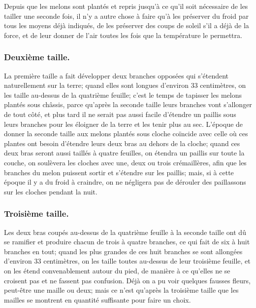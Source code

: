 \documentclass[10pt,a4paper]{book}
\begin{document}
Depuis que les melons sont plantés et repris jusqu'à ce qu'il soit nécessaire de les tailler une seconde fois, il n'y a autre chose à faire qu'à les préserver du froid par tous les moyens déjà indiqués, de les préserver des coups de soleil s'il a déjà de la force, et de leur donner de l'air toutes les fois que la température le permettra.

\subsubsection{Deuxième taille.}

La première taille a fait développer deux branches opposées qui s'étendent naturellement sur la terre; quand elles sont longues d'environ 33 centimètres, on les taille au-dessus de la quatrième feuille; c'est le temps de tapisser les melons plantés sous châssis, parce qu'après la seconde taille leurs branches vont s'allonger de tout côté, et plus tard il ne serait pas aussi facile d'étendre un paillis sous leurs branches pour les éloigner de la terre et les tenir plus au sec. L'époque de donner la seconde taille aux melons plantés sous cloche coïncide avec celle où ces plantes ont besoin d'étendre leurs deux bras au dehors de la cloche; quand ces deux bras seront aussi taillés à quatre feuilles, on étendra un paillis sur toute la couche, on soulèvera les cloches avec une, deux ou trois crémaillères, afin que les branches du melon puissent sortir et s'étendre sur les paillis; mais, si à cette époque il y a du froid à craindre, on ne négligera pas de dérouler des paillassons sur les cloches pendant la nuit.

\subsubsection{Troisième taille.}

Les deux bras coupés au-dessus de la quatrième feuille à la seconde taille ont dû se ramifier et produire chacun de trois à quatre branches, ce qui fait de six à huit branches en tout; quand les plus grandes de ces huit branches se sont allongées d'environ 33 centimètres, on les taille toutes au-dessus de leur troisième feuille, et on les étend convenablement autour du pied, de manière à ce qu'elles ne se croisent pas et ne fassent pas confusion. Déjà on a pu voir quelques fausses fleurs, peut-être une maille ou deux; mais ce n'est qu'après la troisième taille que les mailles se montrent en quantité suffisante pour faire un choix.
\end{document}
